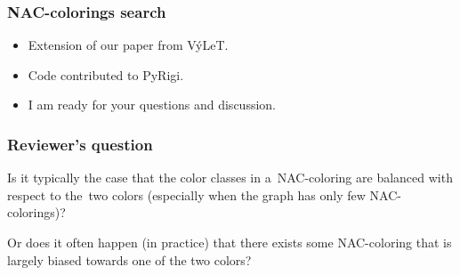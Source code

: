 \documentclass{beamer}
\begin{document}
\begin{frame}
	\frametitle{NAC-colorings search}
	\begin{itemize}
		\item
		      Extension of our paper from VýLeT.
		\item
		      Code contributed to PyRigi.
		\item
		      I am ready for your questions and discussion.
	\end{itemize}
\end{frame}

\begin{frame}
	\frametitle{Reviewer's question}
	Is it typically the case that the color classes in a NAC-coloring are balanced with respect to the two colors (especially when the graph has only few NAC-colorings)?

	Or does it often happen (in practice) that there exists some NAC-coloring that is largely biased towards one of the two colors?
\end{frame}
\end{document}
